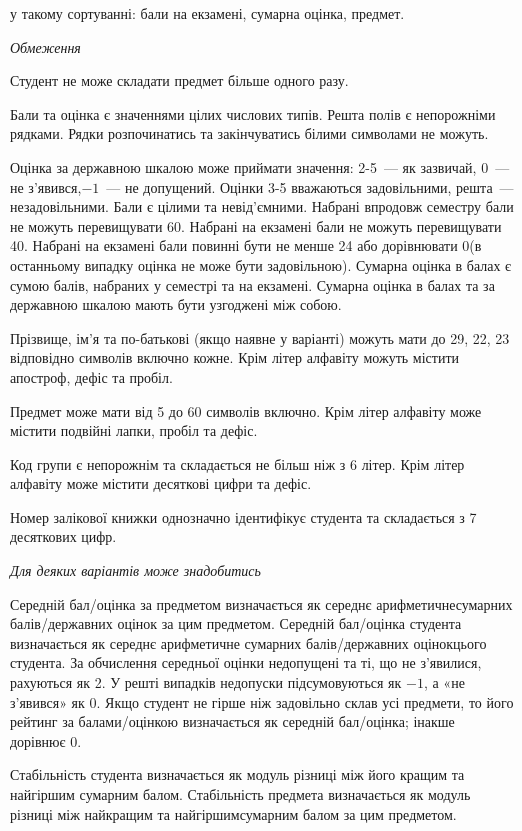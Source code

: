 \documentclass[11pt, ukrainian]{article}
\begin{document}
{\noindent}у такому сортуванні: бали на екзамені, сумарна оцінка, предмет.


\bigskip\textit{Обмеження}

Студент не може складати предмет більше одного разу.

Бали та оцінка є значеннями цілих числових типів. Решта полів є непорожніми рядками.
Рядки розпочинатись та закінчуватись білими символами не можуть.

Оцінка за державною шкалою може приймати значення: 2-5~--- як зазвичай, 0~--- не з’явився,$-1$~--- не допущений. 
Оцінки 3-5 вважаються задовільними, решта~--- незадовільними. 
Бали є цілими та невід’ємними.
Набрані впродовж семестру бали не можуть перевищувати 60. 
Набрані на екзамені бали не можуть перевищувати 40. 
Набрані на екзамені бали повинні бути не менше 24 або дорівнювати 0(в останньому випадку оцінка не може бути задовільною). 
Сумарна оцінка в балах є сумою балів, набраних у семестрі та на екзамені.
Сумарна оцінка в балах та за державною шкалою мають бути узгоджені між собою.

Прізвище, ім’я та по-батькові (якщо наявне у варіанті) можуть мати до 29, 22, 23 відповідно символів включно кожне. 
Крім літер алфавіту можуть містити апостроф, дефіс та пробіл.

Предмет може мати від 5 до 60 символів включно. 
Крім літер алфавіту може містити подвійні лапки, пробіл та дефіс.

Код групи є непорожнім та складається не більш ніж з 6 літер. 
Крім літер алфавіту може містити десяткові цифри та дефіс.


Номер залікової книжки однозначно ідентифікує студента та складається з 7 десяткових цифр. 

\bigskip\textit{Для деяких варіантів може знадобитись}

Середній бал/оцінка за предметом визначається як середнє арифметичнесумарних балів/державних оцінок за цим предметом. 
Середній бал/оцінка студента визначається як середнє арифметичне сумарних балів/державних оцінокцього студента. 
За обчислення середньої оцінки недопущені та ті, що не з’явилися, рахуються як 2.
У решті випадків недопуски підсумовуються як $-1$, а «не з’явився» як 0.
Якщо студент не гірше ніж задовільно склав усі предмети, 
то його рейтинг за балами/оцінкою визначається як середній бал/оцінка; інакше дорівнює 0.

Стабільність студента визначається як модуль різниці між його кращим та найгіршим сумарним балом.
Стабільність предмета визначається як модуль різниці між найкращим та найгіршимсумарним балом за цим предметом.
\end{document}
